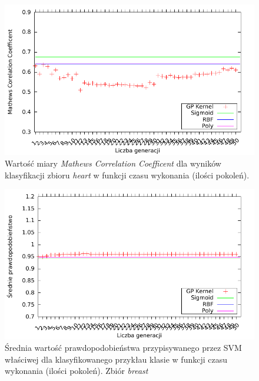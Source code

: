 	\begin{figure}
		\includegraphics[scale=0.90]{figures/results/mcc/mcc-heart}
		\caption{Wartość miary \emph{Mathews Correlation Coefficent} dla wyników klasyfikacji zbioru \emph{heart} w funkcji czasu wykonania (ilości pokoleń).\label{fig:mcc-heart}}
	\end{figure}
	
	\begin{figure}
		\includegraphics[scale=0.90]{figures/results/probability/probability-breast}
		\caption{Średnia wartość prawdopodobieństwa przypisywanego przez SVM właściwej dla klasyfikowanego przykłau klasie w funkcji czasu wykonania (ilości pokoleń). Zbiór \emph{breast}\label{fig:probability-breast}}
	\end{figure}
	
